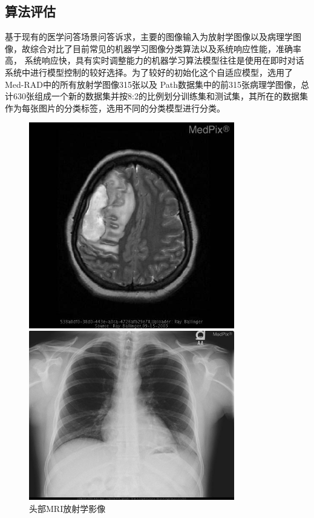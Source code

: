 \subsection{算法评估}
基于现有的医学问答场景问答诉求，主要的图像输入为放射学图像以及病理学图像，故综合对比了目前常见的机器学习图像分类算法以及系统响应性能，准确率高，
系统响应快，具有实时调整能力的机器学习算法模型往往是使用在即时对话系统中进行模型控制的较好选择。为了较好的初始化这个自适应模型，选用了Med-RAD中的所有放射学图像315张以及
Path数据集中的前315张病理学图像，总计630张组成一个新的数据集并按8:2的比例划分训练集和测试集，其所在的数据集作为每张图片的分类标签，选用不同的分类模型进行分类。
\begin{figure}[htbp]
	\begin{minipage}{0.5\linewidth}
		\centering	
		\includegraphics[width=0.8\textwidth]{Fig/myfig/chapter5/data_radmri.jpg}  %
		\caption{\label{close_confusionmatrix}头部MRI放射学影像} 	
	\end{minipage}
	\begin{minipage}{0.5\linewidth}
		\centering	
		\includegraphics[width=0.8\textwidth]{Fig/myfig/chapter5/data_radXray.jpg}  %

\end{minipage}
\end{figure}
